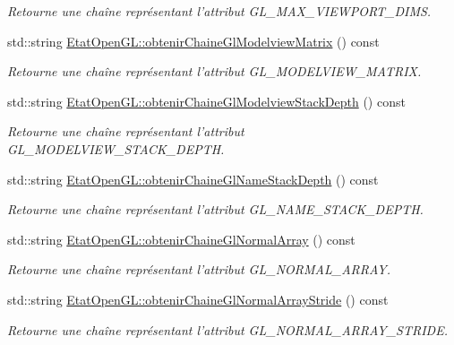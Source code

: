 \begin{DoxyCompactItemize}
\begin{DoxyCompactList}\small\item\em Retourne une chaîne représentant l'attribut G\-L\-\_\-\-M\-A\-X\-\_\-\-V\-I\-E\-W\-P\-O\-R\-T\-\_\-\-D\-I\-M\-S. \end{DoxyCompactList}\item 
std\-::string \hyperlink{group__utilitaire_ga44c62c93a914527f821b2aef913fada7}{Etat\-Open\-G\-L\-::obtenir\-Chaine\-Gl\-Modelview\-Matrix} () const 
\begin{DoxyCompactList}\small\item\em Retourne une chaîne représentant l'attribut G\-L\-\_\-\-M\-O\-D\-E\-L\-V\-I\-E\-W\-\_\-\-M\-A\-T\-R\-I\-X. \end{DoxyCompactList}\item 
std\-::string \hyperlink{group__utilitaire_ga745672a8704edbf33daef5314f9cdfaf}{Etat\-Open\-G\-L\-::obtenir\-Chaine\-Gl\-Modelview\-Stack\-Depth} () const 
\begin{DoxyCompactList}\small\item\em Retourne une chaîne représentant l'attribut G\-L\-\_\-\-M\-O\-D\-E\-L\-V\-I\-E\-W\-\_\-\-S\-T\-A\-C\-K\-\_\-\-D\-E\-P\-T\-H. \end{DoxyCompactList}\item 
std\-::string \hyperlink{group__utilitaire_ga04c7aa5d2e684fa0029e53b8c3b2cda8}{Etat\-Open\-G\-L\-::obtenir\-Chaine\-Gl\-Name\-Stack\-Depth} () const 
\begin{DoxyCompactList}\small\item\em Retourne une chaîne représentant l'attribut G\-L\-\_\-\-N\-A\-M\-E\-\_\-\-S\-T\-A\-C\-K\-\_\-\-D\-E\-P\-T\-H. \end{DoxyCompactList}\item 
std\-::string \hyperlink{group__utilitaire_gaa71b4ce64f1a5f86f8822904e51b549f}{Etat\-Open\-G\-L\-::obtenir\-Chaine\-Gl\-Normal\-Array} () const 
\begin{DoxyCompactList}\small\item\em Retourne une chaîne représentant l'attribut G\-L\-\_\-\-N\-O\-R\-M\-A\-L\-\_\-\-A\-R\-R\-A\-Y. \end{DoxyCompactList}\item 
std\-::string \hyperlink{group__utilitaire_ga9388bcac733bb55d8bff349828b9d86d}{Etat\-Open\-G\-L\-::obtenir\-Chaine\-Gl\-Normal\-Array\-Stride} () const 
\begin{DoxyCompactList}\small\item\em Retourne une chaîne représentant l'attribut G\-L\-\_\-\-N\-O\-R\-M\-A\-L\-\_\-\-A\-R\-R\-A\-Y\-\_\-\-S\-T\-R\-I\-D\-E. \end{DoxyCompactList}\item 

\end{DoxyCompactItemize}
